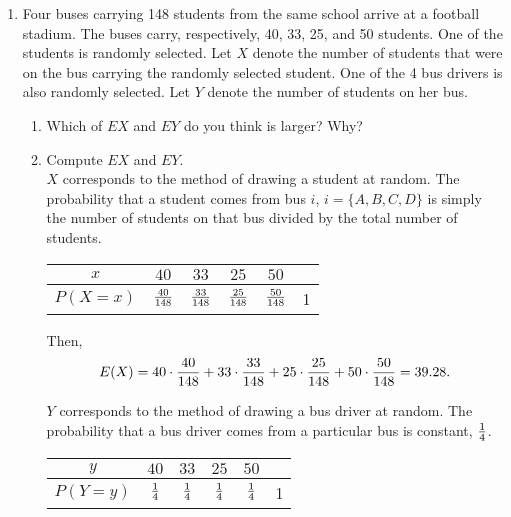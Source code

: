 \documentclass[12pt]{article}%
\newcommand{\0}{{\bf 0}}
\begin{document}
\begin{enumerate}
\item 
Four buses carrying 148 students from the same school 
arrive at a football stadium. 
The buses carry, respectively, 40, 33, 25, and 50 students. 
One of the students is randomly selected. 
Let $X$ denote the number of students 
that were on the bus carrying the randomly selected student. 
One of the 4 bus drivers is also randomly selected. 
Let $Y$ denote the number of students on her bus.
\begin{enumerate}
\item Which of $EX$ and $EY$ do you think is larger? Why?
\\
{\color{blue}{\bf Sol.}}
\item Compute $EX$ and $EY$.
\\
{\color{blue}{\bf Sol.}}
$X$ corresponds to the method of drawing a student at random. The probability that a
student comes from bus $i$, $i = \{A,B,C,D\}$ is simply the number of students on that bus divided by the total number of students.
\begin{table}[H]    \center
\begin{tabular}{|c||c|c|c|c||c|} \hline
           $x$        &   $40$      &   $33$   &$25$    &$50$    &  \\
\hline 
$P(X=x)$    & $\frac{40}{148}$  & $\frac{33}{148}$&$\frac{25}{148}$ & $\frac{50}{148}$ &1\\
\hline


\end{tabular}\vspace{3mm}
\end{table}



Then, $$E(X) = 40 \cdot \frac{40}{148} + 33  \cdot \frac{33}{148} + 25  \cdot\frac{ 25}{148} + 50  \cdot\frac{50}{148} = 39.28.$$



$Y$ corresponds to the method of drawing a bus driver at random. The probability that
a bus driver comes from a particular bus is constant, $\frac{1}{4}$.
\begin{table}[H]    \center
\begin{tabular}{|c||c|c|c|c||c|} \hline
           $y$        &   $40$      &   $33$   &$25$    &$50$    &  \\
\hline 
$P(Y=y)$    & $\frac{1}{4}$  & $\frac{1}{4}$&$\frac{1}{4}$ & $\frac{1}{4}$ &1\\
\hline


\end{tabular}\vspace{3mm}
\end{table}


\end{enumerate}
\end{enumerate}
\end{document}
